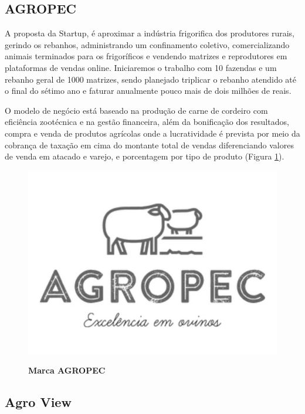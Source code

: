 \subsection{AGROPEC}


A proposta da Startup, é aproximar a indústria frigorifica dos  produtores rurais, gerindo os rebanhos, administrando um 
confinamento coletivo, comercializando animais terminados para os frigoríficos e vendendo matrizes e reprodutores em plataformas de vendas online. Iniciaremos o trabalho com 10 fazendas e um rebanho geral de 1000 matrizes, sendo planejado triplicar o rebanho atendido até o final do sétimo ano e faturar anualmente pouco mais de dois milhões de reais.

O modelo de negócio está baseado na produção de carne de  cordeiro com eficiência zootécnica e na gestão financeira, além 
da bonificação dos resultados, compra e venda de produtos  agrícolas onde a lucratividade é prevista por meio da cobrança de taxação em cima do montante total de vendas diferenciando valores de venda em atacado e varejo, e porcentagem por tipo de produto (Figura \ref{figura_18}).


\begin{figure}[H]
\centering
\caption{\textbf{Marca AGROPEC}}
\includegraphics[scale=0.2]{Imagens/agropec.jpg}
\label{figura_18}
\end{figure}

\subsection{Agro View}


